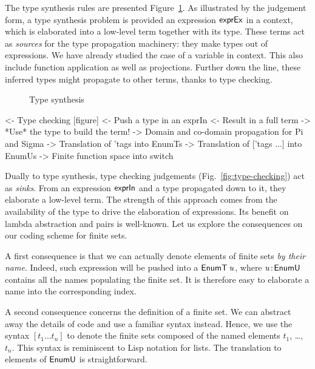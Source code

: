 The type synthesis rules are presented
Figure~\ref{fig:type-synthesis}. As illustrated by the judgement form,
a type synthesis problem is provided an expression $\textsf{exprEx}$ in a
context, which is elaborated into a low-level term together with its
type. These terms act as \emph{sources} for the type propagation
machinery: they make types out of expressions. We have already studied
the case of a variable in context. This also include function
application as well as projections. Further down the line, these
inferred types might propagate to other terms, thanks to type
checking.

\begin{figure}

\caption{Type synthesis}
\label{fig:type-synthesis}
\end{figure}



\begin{wstructure}
<- Type checking [figure]
    <- Push a type in an exprIn
    <- Result in a full term
    -> *Use* the type to build the term!
        -> Domain and co-domain propagation for Pi and Sigma
        -> Translation of 'tags into EnumTs
        -> Translation of ['tags ...] into EnumUs
        -> Finite function space into switch
\end{wstructure}

Dually to type synthesis, type checking judgements
(Fig.~\ref{fig:type-checking}) act as \emph{sinks}. From an expression
$\textsf{exprIn}$ and a type propagated down to it, they elaborate a low-level
term. The strength of this approach comes from the availability of the
type to drive the elaboration of expressions. Its benefit on lambda
abstraction and pairs is well-known. Let us explore the consequences
on our coding scheme for finite sets.

A first consequence is that we can actually denote elements of finite
sets \emph{by their name}. Indeed, such expression will be pushed into
a $\EnumT{\V{u}}$, where $\Bhab{\V{u}}{\EnumU}$ contains all the names
populating the finite set. It is therefore easy to elaborate a name
into the corresponding index.

A second consequence concerns the definition of a finite set. We can
abstract away the details of code and use a familiar syntax
instead. Hence, we use the syntax $[t_1 \ldots t_n]$ to denote the
finite sets composed of the named elements $t_1$, \ldots, $t_n$. This
syntax is reminiscent to Lisp notation for lists. The translation to
elements of $\EnumU$ is straightforward.

